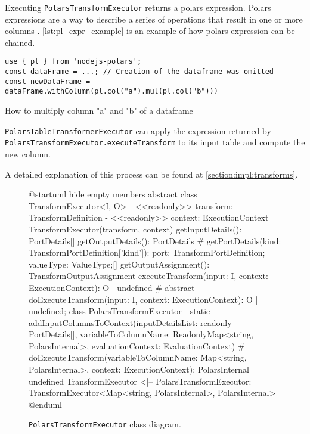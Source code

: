 Executing \Verb|PolarsTransformExecutor| returns a polars expression.
Polars expressions are a way to describe a series of operations that result in one or more columns \autocite{polars:docs:expr}.
\ref{lst:pl_expr_example} is an example of how polars expression can be chained.
\begin{listing}
	\begin{verbatim}
use { pl } from 'nodejs-polars';
const dataFrame = ...; // Creation of the dataframe was omitted
const newDataFrame = dataFrame.withColumn(pl.col("a").mul(pl.col("b")))
	\end{verbatim}
	\caption{How to multiply column "a" and "b" of a dataframe}
	\label{lst:pl_expr_example}
\end{listing}
\Verb|PolarsTableTransformerExecutor| can apply the expression returned by \Verb|PolarsTransformExecutor.executeTransform| to its input table and compute the new column.

A detailed explanation of this process can be found at \ref{section:impl:transforms}.

\begin{figure}
	\begin{plantuml}
		@startuml
		hide empty members
		abstract class TransformExecutor<I, O> {
		- <<readonly>> transform: TransformDefinition
		- <<readonly>> context: ExecutionContext
		TransformExecutor(transform, context)
		getInputDetails(): PortDetails[]
		getOutputDetails(): PortDetails
		# getPortDetails(kind: TransformPortDefinition['kind']): { port: TransformPortDefinition; valueType: ValueType;}[]
		getOutputAssignment(): TransformOutputAssignment
		executeTransform(input: I, context: ExecutionContext): O | undefined
		# {abstract} doExecuteTransform(input: I, context: ExecutionContext): O | undefined;
		}
		class PolarsTransformExecutor  {
		- {static} addInputColumnsToContext(inputDetailsList: readonly PortDetails[], variableToColumnName: ReadonlyMap<string, PolarsInternal>, evaluationContext: EvaluationContext)
		# doExecuteTransform(variableToColumnName: Map<string, PolarsInternal>, context: ExecutionContext): PolarsInternal | undefined
		}
		TransformExecutor <|-- PolarsTransformExecutor: TransformExecutor<Map<string, PolarsInternal>, PolarsInternal>
		@enduml
	\end{plantuml}
	\caption{\Verb|PolarsTransformExecutor| class diagram.}
	\label{fig:uml:transformexecutor}
\end{figure}

